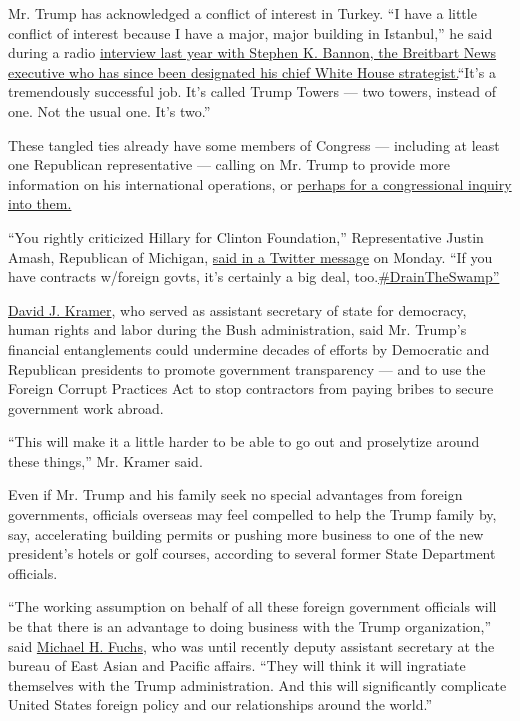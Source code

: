 Mr. Trump has acknowledged a conflict of interest in Turkey. ``I have a
little conflict of interest because I have a major, major building in
Istanbul,'' he said during a radio
\href{http://www.breitbart.com/2016-presidential-race/2015/12/01/trump-blasts-obama-warning-world-war-iii/}{interview
last year with Stephen K. Bannon, the Breitbart News executive who has
since been designated his chief White House strategist.}``It's a
tremendously successful job. It's called Trump Towers --- two towers,
instead of one. Not the usual one. It's two.''

These tangled ties already have some members of Congress --- including
at least one Republican representative --- calling on Mr. Trump to
provide more information on his international operations, or
\href{http://www.warren.senate.gov/files/documents/2016-11-23-GAO_Letter_On_Trump_Transition.pdf}{perhaps
for a congressional inquiry into them.}

``You rightly criticized Hillary for Clinton Foundation,''
Representative Justin Amash, Republican of Michigan,
\href{https://twitter.com/justinamash/status/800914868039655425}{said in
a Twitter message} on Monday. ``If you have contracts w/foreign govts,
it's certainly a big deal,
too.\href{https://twitter.com/hashtag/DrainTheSwamp?src=hash}{\#DrainTheSwamp''}

\href{https://www.mccaininstitute.org/staff/david-j-kramer/}{David J.
Kramer}, who served as assistant secretary of state for democracy, human
rights and labor during the Bush administration, said Mr. Trump's
financial entanglements could undermine decades of efforts by Democratic
and Republican presidents to promote government transparency --- and to
use the Foreign Corrupt Practices Act to stop contractors from paying
bribes to secure government work abroad.

``This will make it a little harder to be able to go out and proselytize
around these things,'' Mr. Kramer said.

Even if Mr. Trump and his family seek no special advantages from foreign
governments, officials overseas may feel compelled to help the Trump
family by, say, accelerating building permits or pushing more business
to one of the new president's hotels or golf courses, according to
several former State Department officials.

``The working assumption on behalf of all these foreign government
officials will be that there is an advantage to doing business with the
Trump organization,'' said
\href{http://www.state.gov/r/pa/ei/biog/bureau/204807.htm}{Michael H.
Fuchs}, who was until recently deputy assistant secretary at the bureau
of East Asian and Pacific affairs. ``They will think it will ingratiate
themselves with the Trump administration. And this will significantly
complicate United States foreign policy and our relationships around the
world.''

